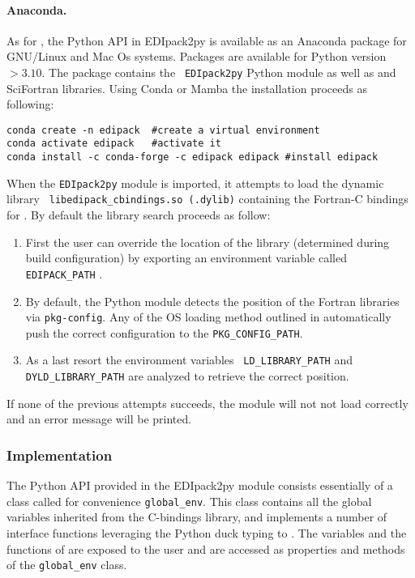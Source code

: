\documentclass[edipack_sp.tex]{subfiles}
\begin{document}
\paragraph{Anaconda.}
As for \NAME, the Python API in EDIpack2py is available as an
Anaconda package for GNU/Linux and Mac Os systems. Packages are available for
Python version $>3.10$. The \NAME package contains the {\tt
  EDIpack2py} Python module as well as \NAME and SciFortran
libraries. 
Using Conda or Mamba the installation proceeds as following:
\begin{lstlisting}[style=mybash]
conda create -n edipack  #create a virtual environment
conda activate edipack   #activate it
conda install -c conda-forge -c edipack edipack #install edipack
\end{lstlisting}

\noindent
When the {\tt EDIpack2py}    module is imported, it attempts to load the dynamic library {\tt
  libedipack\-\_cbindings.so (.dylib)} containing the Fortran-C bindings
for \NAME. By default the library search proceeds as follow: 
\begin{enumerate}
\item First the user can override the location of the library
  (determined during \NAME build configuration) by exporting an
  environment variable called {\tt EDIPACK\_PATH} .
\item By default, the Python module detects the position of the
  Fortran libraries via {\tt pkg-config}. Any of the OS loading method
  outlined in  automatically push the
  correct configuration to the {\tt PKG\_CONFIG\_PATH}. 
\item As a last resort the environment variables {\tt
    LD\_LIBRARY\_PATH} and {\tt DYLD\_LIBRARY\_PATH} are analyzed to
  retrieve the correct position. 
\end{enumerate}
If none of the previous attempts succeeds, the module will not not load correctly and an error message will be printed. 



\subsubsection{Implementation}\label{sSecInteropEDIpyImplementation}
The Python API provided in the EDIpack2py module consists essentially of a
class called for convenience {\tt global\_env}.
This class contains all the global variables inherited from the \NAME
C-bindings library, and implements a number of interface functions
leveraging the Python duck typing to \NAME.  
The variables and the functions of \NAME are exposed to the user and
are accessed as properties and
methods of the {\tt global\_env} class.
\end{document}
